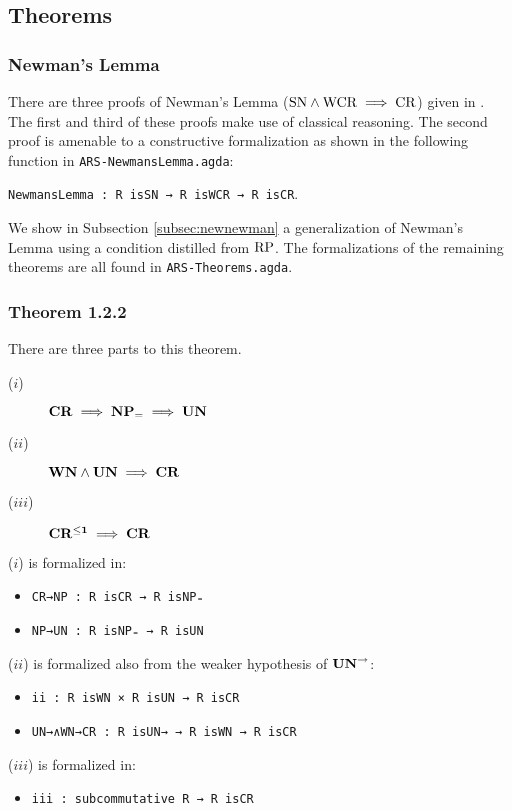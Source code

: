 \subsection{Theorems}\label{subsec:theorems}
\subsubsection{Newman's Lemma}
There are three proofs of Newman's Lemma ($\mathrm{SN} \land \mathrm{WCR} \implies \mathrm{CR}$) given in \terese. 
The first and third of these proofs make use of classical reasoning. The second proof is amenable to a 
constructive formalization as shown in the following function in \texttt{ARS-NewmansLemma.agda}:

\verb|NewmansLemma : R isSN → R isWCR → R isCR|.

We show in Subsection \ref{subsec:newnewman} a generalization of Newman's Lemma using a condition distilled from $\mathrm{RP}$. 
The formalizations of the remaining theorems are all found in \texttt{ARS-Theorems.agda}. 
\subsubsection{Theorem 1.2.2}
There are three parts to this theorem. 
\begin{description}
    \item[($i$)] $\mathbf{CR} \implies \mathbf{NP_=} \implies \mathbf{UN}$
    \item[($ii$)] $\mathbf{WN} \land \mathbf{UN} \implies \mathbf{CR}$  
    \item[($iii$)] $\mathbf{CR^{\le 1}} \implies \mathbf{CR}$
\end{description}

($i$) is formalized in:
\begin{itemize}
    \item \verb|CR→NP : R isCR → R isNP₌|
    \item \verb|NP→UN : R isNP₌ → R isUN|
\end{itemize}

($ii$) is formalized also from the weaker hypothesis of $\mathbf{UN}^{\to}$:
\begin{itemize}
    \item \verb|ii : R isWN × R isUN → R isCR|
    \item \verb|UN→∧WN→CR : R isUN→ → R isWN → R isCR|
\end{itemize}

($iii$) is formalized in:
\begin{itemize}
    \item \verb|iii : subcommutative R → R isCR|
\end{itemize}

